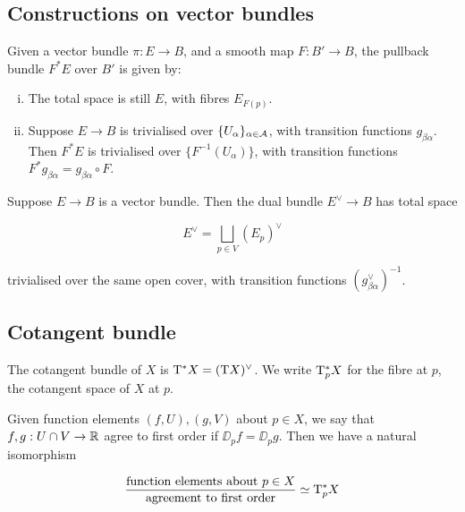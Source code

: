 \subsection{Constructions on vector bundles}

\begin{definition}
    [pullback] Given a vector bundle \(\pi : E \to B\), and a smooth map \(F : B' \to B\), the pullback bundle \(F^*E\) over \(B'\) is given by:

    \begin{enumerate}[(i)]
        \item The total space is still \(E\), with fibres \(E_{F(p)}\).
        \item Suppose \(E \to B\) is trivialised over \(\{U_\alpha\}_{\alpha \in \mathcal{A}}\), with transition functions \(g_{\beta\alpha}\). Then \(F^* E\) is trivialised over \(\{F^{-1}(U_\alpha)\}\), with transition functions \(F^*g_{\beta\alpha} = g_{\beta\alpha} \circ F\).
    \end{enumerate}
\end{definition}

\begin{definition}

    Suppose \(E \to B\) is a vector bundle. Then the dual bundle \(E^\vee \to B\) has total space

    \[E^\vee = \bigsqcup_{p \in V}(E_p)^\vee\]

    trivialised over the same open cover, with transition functions \((g_{\beta\alpha}^\vee)^{-1}\).
\end{definition}

\subsection{Cotangent bundle}

\begin{definition}

    The cotangent bundle of \(X\) is \(\mathrm{T}^*X = (\mathrm{T} X)^\vee\). We write \(\mathrm{T}^*_pX\) for the fibre at \(p\), the cotangent space of \(X\) at \(p\).
\end{definition}

\begin{proposition}
    Given function elements \((f, U), (g, V)\) about \(p \in X\), we say that \(f, g : U \cap V \to \mathbb{R}\) agree to first order if \(\DD_pf = \DD_p g\). Then we have a natural isomorphism

    \[\frac{\text{function elements about }p \in X}{\text{agreement to first order}} \simeq \mathrm{T}^*_pX\]
\end{proposition}

